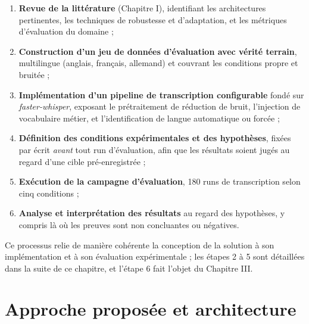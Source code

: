 \documentclass[12pt]{report}
\begin{document}
\begin{enumerate}
    \item \textbf{Revue de la littérature} (Chapitre I), identifiant les architectures pertinentes, les techniques de robustesse et d'adaptation, et les métriques d'évaluation du domaine ;
    \item \textbf{Construction d'un jeu de données d'évaluation avec vérité terrain}, multilingue (anglais, français, allemand) et couvrant les conditions propre et bruitée ;
    \item \textbf{Implémentation d'un pipeline de transcription configurable} fondé sur \textit{faster-whisper}, exposant le prétraitement de réduction de bruit, l'injection de vocabulaire métier, et l'identification de langue automatique ou forcée ;
    \item \textbf{Définition des conditions expérimentales et des hypothèses}, fixées par écrit \emph{avant} tout run d'évaluation, afin que les résultats soient jugés au regard d'une cible pré-enregistrée ;
    \item \textbf{Exécution de la campagne d'évaluation}, 180 runs de transcription selon cinq conditions ;
    \item \textbf{Analyse et interprétation des résultats} au regard des hypothèses, y compris là où les preuves sont non concluantes ou négatives.
\end{enumerate}
Ce processus relie de manière cohérente la conception de la solution à son implémentation et à son évaluation expérimentale ; les étapes 2 à 5 sont détaillées dans la suite de ce chapitre, et l'étape 6 fait l'objet du Chapitre III.
\section{Approche proposée et architecture}
\end{document}
